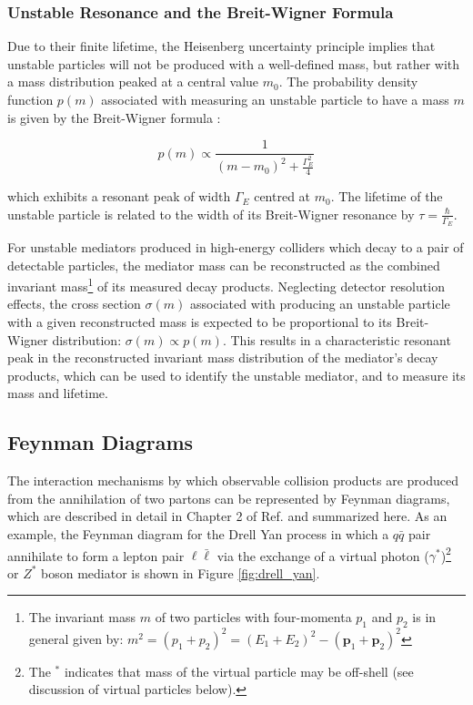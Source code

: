 
\subsubsection{Unstable Resonance and the Breit-Wigner Formula}

Due to their finite lifetime, the Heisenberg uncertainty principle implies that unstable particles will not be produced with a well-defined mass, but rather with a mass distribution peaked at a central value \(m_0\). The probability density function \(p(m)\) associated with measuring an unstable particle to have a mass \(m\) is given by the Breit-Wigner formula \cite{breit_wigner}:

\begin{equation}
\label{eq:breit_wigner}
p(m) \propto \frac{1}{(m-m_0)^2 + \frac{\Gamma_E^2}{4}}
\end{equation}

\noindent which exhibits a resonant peak of width \(\Gamma_E\) centred at \(m_0\). The lifetime of the unstable particle is related to the width of its Breit-Wigner resonance by \(\tau = \frac{\hbar}{\Gamma_E}\).

For unstable mediators produced in high-energy colliders which decay to a pair of detectable particles, the mediator mass can be reconstructed as the combined invariant mass\footnote{The invariant mass \(m\) of two particles with four-momenta \(p_1\) and \(p_2\) is in general given by: \(m^2 = (p_1 + p_2)^2 = (E_1+E_2)^2 - (\mathbf{p}_1+\mathbf{p}_2)^2\)} of its measured decay products. Neglecting detector resolution effects, the cross section \(\sigma(m)\) associated with producing an unstable particle with a given reconstructed mass is expected to be proportional to its Breit-Wigner distribution: \(\sigma(m)\propto p(m)\). This results in a characteristic resonant peak in the reconstructed invariant mass distribution of the mediator's decay products, which can be used to identify the unstable mediator, and to measure its mass and lifetime.

\subsection{Feynman Diagrams}

The interaction mechanisms by which observable collision products are produced from the annihilation of two partons can be represented by Feynman diagrams, which are described in detail in Chapter 2 of Ref. \cite{griffiths_2008} and summarized here. As an example, the Feynman diagram for the Drell Yan process in which a \(q\bar{q}\) pair annihilate to form a lepton pair \(\ell\bar{\ell}\) via the exchange of a virtual photon (\(\gamma^{*}\))\footnote{The \(^{*}\) indicates that mass of the virtual particle may be off-shell (see discussion of virtual particles below).} or \(Z^{*}\) boson mediator is shown in Figure \ref{fig:drell_yan}. 


